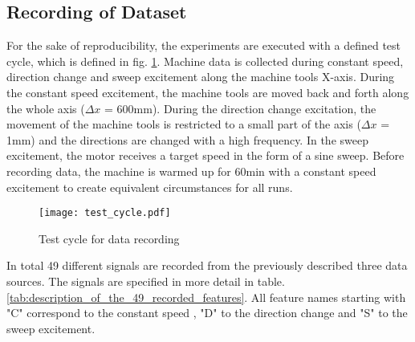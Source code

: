 \subsection{Recording of Dataset}
For the sake of reproducibility, the experiments are executed with a defined test cycle, which is defined in fig. \ref{fig:test_cycle}. Machine data is collected during constant speed, direction change and sweep excitement along the machine tools X-axis. During the constant speed excitement, the machine tools are moved back and forth along the whole axis ($\Delta x$ = 600mm). During the direction change excitation, the movement of the machine tools is restricted to a small part of the axis ($\Delta x$ = 1mm) and the directions are changed with a high frequency. In the sweep excitement, the motor receives a target speed in the form of a sine sweep. Before recording data, the machine is warmed up for 60min with a constant speed excitement to create equivalent circumstances for all runs.

\begin{figure}[H]
  \centering
  \texttt{[image: test\_cycle.pdf]}
  \caption {Test cycle for data recording}
  \label{fig:test_cycle}
\end{figure}

In total 49 different signals are recorded from the previously described three data sources. The signals are specified in more detail in table. \ref{tab:description_of_the_49_recorded_features}. All feature names starting with "C" correspond to the constant speed , "D" to the direction change and "S" to the sweep excitement.

